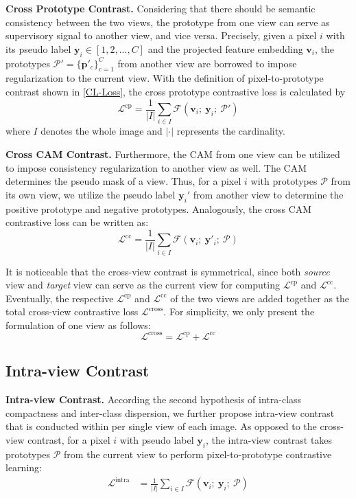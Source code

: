 \documentclass[10pt,twocolumn,letterpaper]{article}
\begin{document}
\textbf{Cross Prototype Contrast.}
Considering that there should be semantic consistency between the two views, the prototype from one view can serve as supervisory signal to another view, and vice versa.
Precisely, given a pixel $i$ with its pseudo label $\boldsymbol{y}_i \in [1,2,...,C]$ and the projected feature embedding $\boldsymbol{v}_i$,
the prototypes $\mathcal{P}'=\{\boldsymbol{p}'_{c}\}_{c=1}^C$ from another view are borrowed to impose regularization to the current view.
With the definition of pixel-to-prototype contrast shown in \cref{CL-Loss}, the cross prototype contrastive loss is calculated by
\begin{equation}
    \mathcal{L}^{\text{cp}} = \frac{1}{\lvert I \rvert}\sum_{i\in I}\mathcal{F}(\boldsymbol{v}_i;\ \boldsymbol{y}_i;\ \mathcal{P'})
\end{equation}
where $I$ denotes the whole image and $\lvert \cdot \rvert$ represents the cardinality.

\textbf{Cross CAM Contrast.}
Furthermore, the CAM from one view can be utilized to impose consistency regularization to another view as well.
The CAM determines the pseudo mask of a view.
Thus, for a pixel $i$ with prototypes $\mathcal{P}$ from its own view, we utilize the pseudo label $\boldsymbol{y}_i'$ from another view to determine the positive prototype and negative prototypes.
Analogously, the cross CAM contrastive loss can be written as:
\begin{equation}
    \mathcal{L}^{\text{cc}} = \frac{1}{|I|} \sum_{i \in I}\mathcal{F}(\boldsymbol{v}_i;\ \boldsymbol{y}'_i;\ \mathcal{P})
\end{equation}

It is noticeable that the cross-view contrast is symmetrical, since both \textit{source} view and \textit{target} view can serve as the current view for computing $\mathcal{L}^{\text{cp}}$ and $\mathcal{L}^{\text{cc}}$.
Eventually, the respective $\mathcal{L}^{\text{cp}}$ and $\mathcal{L}^{\text{cc}}$ of the two views are added together as the total cross-view contrastive loss $\mathcal{L}^{\text{cross}}$.
For simplicity, we only present the formulation of one view as follows:
\begin{equation}
    \mathcal{L}^{\text{cross}} = \mathcal{L}^{\text{cp}} + \mathcal{L}^{\text{cc}}
\end{equation}


\subsection{Intra-view Contrast}
\textbf{Intra-view Contrast.} 
According the second hypothesis of intra-class compactness and inter-class dispersion, we further propose intra-view contrast that is conducted within per single view of each image.
As opposed to the cross-view contrast, for a pixel $i$ with pseudo label $\boldsymbol{y}_i$, the intra-view contrast takes prototypes $\mathcal{P}$ from the current view to perform pixel-to-prototype contrastive learning:
\begin{align}
    \mathcal{L}^{\text{intra}} &= \frac{1}{|I|} \sum_{i\in I}  \mathcal{F}(\boldsymbol{v}_{i};\  \boldsymbol{y}_{i};\ \mathcal{P})
    \label{aaa}
\end{align}
\end{document}
